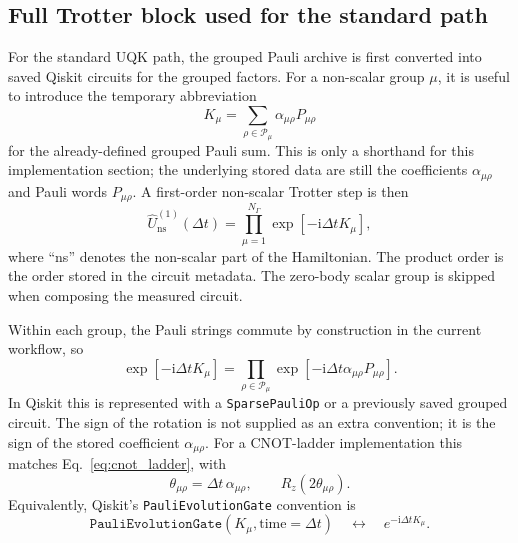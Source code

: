 \documentclass[11pt]{article}
\newcommand{\ii}{\mathrm{i}}
\begin{document}
\subsection{Full Trotter block used for the standard path}

For the standard UQK path, the grouped Pauli archive is first converted into saved Qiskit circuits for the grouped factors.  For a non-scalar group $\mu$, it is useful to introduce the temporary abbreviation
\begin{equation}
    K_\mu
    =
    \sum_{\rho\in\mathcal{P}_\mu}\alpha_{\mu\rho}P_{\mu\rho}
\end{equation}
for the already-defined grouped Pauli sum.  This is only a shorthand for this implementation section; the underlying stored data are still the coefficients $\alpha_{\mu\rho}$ and Pauli words $P_{\mu\rho}$.  A first-order non-scalar Trotter step is then
\begin{equation}
    \hat{U}^{(1)}_{\mathrm{ns}}(\Delta t)
    =
    \prod_{\mu=1}^{N_\Gamma}
    \exp\left[-\ii\Delta t K_\mu\right],
    \label{eq:code_standard_non_scalar_step}
\end{equation}
where ``ns'' denotes the non-scalar part of the Hamiltonian.  The product order is the order stored in the circuit metadata.  The zero-body scalar group is skipped when composing the measured circuit.

Within each group, the Pauli strings commute by construction in the current workflow, so
\begin{equation}
    \exp\left[-\ii\Delta t K_\mu\right]
    =
    \prod_{\rho\in\mathcal{P}_\mu}
    \exp\left[-\ii\Delta t\alpha_{\mu\rho}P_{\mu\rho}\right].
\end{equation}
In Qiskit this is represented with a \texttt{SparsePauliOp} or a previously saved grouped circuit.  The sign of the rotation is not supplied as an extra convention; it is the sign of the stored coefficient $\alpha_{\mu\rho}$.  For a CNOT-ladder implementation this matches Eq.~\eqref{eq:cnot_ladder}, with
\begin{equation}
    \theta_{\mu\rho}=\Delta t\,\alpha_{\mu\rho},
    \qquad
    R_z(2\theta_{\mu\rho}).
\end{equation}
Equivalently, Qiskit's \texttt{PauliEvolutionGate} convention is
\begin{equation}
    \texttt{PauliEvolutionGate}(K_\mu,\mathrm{time}=\Delta t)
    \quad\longleftrightarrow\quad
    e^{-\ii\Delta t K_\mu}.
\end{equation}
\end{document}
